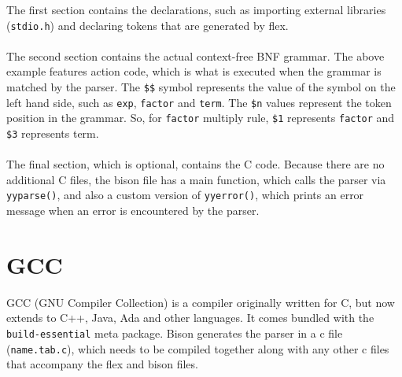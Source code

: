 \documentclass[12pt]{report}
\begin{document}
The first section contains the declarations, such as importing external libraries (\texttt{stdio.h}) and declaring tokens that are generated by flex.\\
\\
The second section contains the actual context-free BNF grammar.  The above example features action code, which is what is executed when the grammar is matched by the parser.  The \texttt{\$\$} symbol represents the value of the symbol on the left hand side, such as \texttt{exp}, \texttt{factor} and \texttt{term}.  The \texttt{\$n} values represent the token position in the grammar.  So, for \texttt{factor} multiply rule, \texttt{\$1} represents \texttt{factor} and \texttt{\$3} represents term.\\
\\
The final section, which is optional, contains the C code.  Because there are no additional C files, the bison file has a main function, which calls the parser via \texttt{yyparse()}, and also a custom version of \texttt{yyerror()}, which prints an error message when an error is encountered by the parser.
\section{GCC}\label{fig:gcc}
GCC (GNU Compiler Collection) is a compiler originally written for C, but now extends to C++, Java, Ada and other languages.  It comes bundled with the \texttt{build-essential} meta package.  Bison generates the parser in a c file (\texttt{name.tab.c}), which needs to be compiled together along with any other c files that accompany the flex and bison files.
\end{document}
